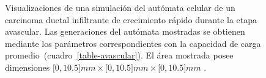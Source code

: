 \begin{figure}[!ht]
\begin{center}
\end{center}\vspace*{-0.6cm}
\caption[Visualizaciones de una simulaci\'on del aut\'omata celular de un carcinoma ductal infiltrante de crecimiento r\'apido durante la etapa avascular]{Visualizaciones de una simulaci\'on del aut\'omata celular de un carcinoma ductal infiltrante de crecimiento r\'apido durante la etapa avascular. Las generaciones del aut\'omata mostradas se obtienen mediante los par\'ametros correspondientes con la capacidad de carga promedio~(cuadro~\ref{table-avascular}). El \'area mostrada posee dimensiones $[0,10$.$5]mm \times [0,10$.$5]mm \times [0,10$.$5]mm$ .}
\label{fig-avascular-automata}
\end{figure}


